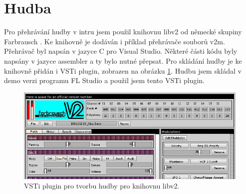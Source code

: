 
\section{Hudba}

Pro přehrávání hudby v intru jsem použil knihovnu libv2 od německé skupiny Farbrausch \cite{V2}.
Ke knihovně je dodáván i příklad přehrávače souborů v2m.
Přehrávač byl napsán v jazyce C pro Visual Studio.
Některé části kódu byly napsány v jazyce assembler a ty bylo nutné přepsat.
Pro skládání hudby je ke knihovně přidán i VSTi plugin, zobrazen na obrázku \ref{fig:vsti}.
Hudbu jsem skládal v demo verzi programu FL Studio \cite{FLS} a použil jsem tento VSTi plugin.

\begin{figure}[h]
\centering
\includegraphics[width=15cm,keepaspectratio]{obr/vsti.jpg}
\caption{VSTi plugin pro tvorbu hudby pro knihovnu libv2.}
\label{fig:vsti}
\end{figure}

